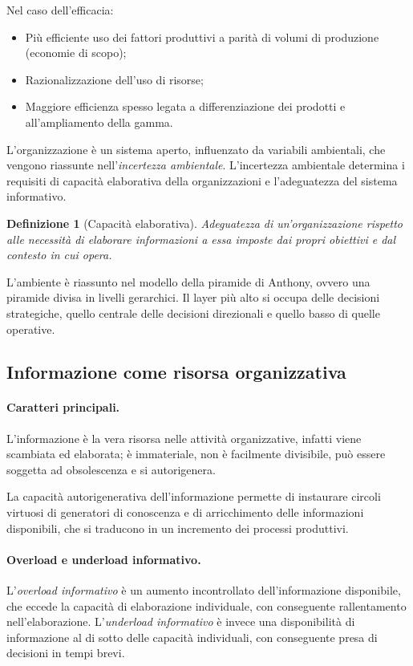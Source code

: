\documentclass[a4paper, 10pt]{article}
\newtheorem{definit}{Definizione}[subsection]
\begin{document}
	Nel caso dell'efficacia: \begin{itemize}
		\item Più efficiente uso dei fattori produttivi a parità di volumi di produzione (economie di scopo);
		\item Razionalizzazione dell'uso di risorse;
		\item Maggiore efficienza spesso legata a differenziazione dei prodotti e all’ampliamento della gamma.
	\end{itemize}
	
	L'organizzazione è un sistema aperto, influenzato da variabili ambientali, che vengono riassunte nell'\textit{incertezza ambientale}.
	L'incertezza ambientale determina i requisiti di capacità elaborativa della organizzazioni e l'adeguatezza del sistema informativo.
	
	\begin{definit}[Capacità elaborativa]
		Adeguatezza di un’organizzazione rispetto alle necessità di elaborare informazioni a essa imposte dai propri obiettivi e dal contesto in cui opera.
	\end{definit}
	
	L'ambiente è riassunto nel modello della piramide di Anthony, ovvero una piramide divisa in livelli gerarchici.
	Il layer più alto si occupa delle decisioni strategiche, quello centrale delle decisioni direzionali e quello basso di quelle operative.
	
	
	
	\subsection{Informazione come risorsa organizzativa}
	\paragraph{Caratteri principali.} L'informazione è la vera risorsa nelle attività organizzative, infatti viene scambiata ed elaborata; è immateriale, non è facilmente divisibile, può essere soggetta ad obsolescenza e si autorigenera.
	
	La capacità autorigenerativa dell'informazione permette di instaurare circoli virtuosi di generatori di conoscenza e di arricchimento delle informazioni disponibili, che si traducono in un incremento dei processi produttivi.
	
	\paragraph{Overload e underload informativo.} L'\textit{overload informativo} è un aumento incontrollato dell'informazione disponibile, che eccede la capacità di elaborazione individuale, con conseguente rallentamento nell'elaborazione. L'\textit{underload informativo} è invece una disponibilità di informazione al di sotto delle capacità individuali, con conseguente presa di decisioni in tempi brevi.
	
\end{document}
